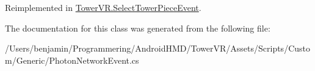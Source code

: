 Reimplemented in \hyperlink{class_tower_v_r_1_1_select_tower_piece_event_addf1cb68acf541e199df157a32ab25ca}{Tower\+V\+R.\+Select\+Tower\+Piece\+Event}.



The documentation for this class was generated from the following file\+:\begin{DoxyCompactItemize}
\item 
/\+Users/benjamin/\+Programmering/\+Android\+H\+M\+D/\+Tower\+V\+R/\+Assets/\+Scripts/\+Custom/\+Generic/Photon\+Network\+Event.\+cs\end{DoxyCompactItemize}
